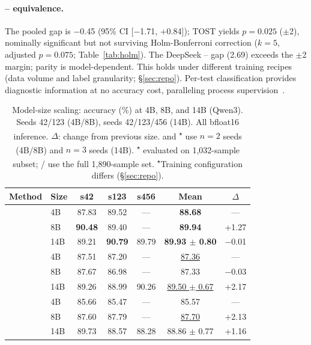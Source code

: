 \paragraph{\cls{}--\traj{} equivalence.} The pooled gap is $-$0.45\pp{} (95\% CI [$-$1.71, +0.84]); TOST yields $p = 0.025$ ($\pm$2\pp{}), nominally significant but not surviving Holm-Bonferroni correction ($k{=}5$, adjusted $p{=}0.075$; Table~\ref{tab:holm}). The DeepSeek \cls{}--\traj{} gap (2.69\pp{}) exceeds the $\pm$2\pp{} margin; \traj{} parity is model-dependent. This holds under different training recipes (data volume and label granularity; \S\ref{sec:repo}). Per-test classification provides diagnostic information at no accuracy cost, paralleling process supervision~\cite{lightman2023letsverify}.

\begin{table}[t]
\centering
\small
\caption{Model-size scaling: accuracy (\%) at 4B, 8B, and 14B (Qwen3). Seeds 42/123 (4B/8B), seeds 42/123/456 (14B). All bfloat16 inference. $\Delta$: change from previous size. \cwm{} and \traj{}\textsuperscript{$\star$} use $n{=}2$ seeds (4B/8B) and $n{=}3$ seeds (14B). \traj{}\textsuperscript{$\star$} evaluated on 1{,}032-sample subset; \cls{}/\cwm{} use the full 1{,}890-sample set. \textsuperscript{$\star$}Training configuration differs (\S\ref{sec:repo}).}
\label{tab:scaling}
\setlength{\tabcolsep}{3pt}
\begin{tabular}{llccccc}
\toprule
\textbf{Method} & \textbf{Size} & \textbf{s42} & \textbf{s123} & \textbf{s456} & \textbf{Mean} & \textbf{$\Delta$} \\
\midrule
\multirow{3}{*}{\cls{}} & 4B & 87.83 & 89.52 & --- & \textbf{88.68} & --- \\
 & 8B & \textbf{90.48} & 89.40 & --- & \textbf{89.94} & +1.27 \\
 & 14B & 89.21 & \textbf{90.79} & 89.79 & \textbf{89.93 $\pm$ 0.80} & $-$0.01 \\
\midrule
\multirow{3}{*}{\cwm{}} & 4B & 87.51 & 87.20 & --- & \underline{87.36} & --- \\
 & 8B & 87.67 & 86.98 & --- & 87.33 & $-$0.03 \\
 & 14B & 89.26 & 88.99 & 90.26 & \underline{89.50 $\pm$ 0.67} & +2.17 \\
\midrule
\multirow{3}{*}{\traj{}} & 4B & 85.66 & 85.47 & --- & 85.57 & --- \\
 & 8B & 87.60 & 87.79 & --- & \underline{87.70} & +2.13 \\
 & 14B & 89.73 & 88.57 & 88.28 & 88.86 $\pm$ 0.77 & +1.16 \\
\bottomrule
\end{tabular}
\end{table}

